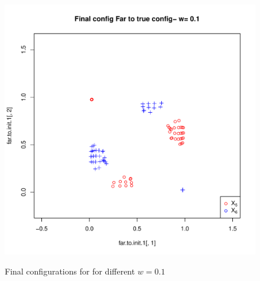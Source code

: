 \documentclass[12pt,oneside,final]{thesis}
\begin{document}
\begin{figure}
\begin{minipage}[b]{0.5\linewidth}
\label{fig:Finalconfig-MultMin-w-0_1_a}
\end{minipage}
\hspace{0.5cm}
\begin{minipage}[b]{0.5\linewidth}
\centering
\includegraphics[scale=0.45]{other-min-w-0_1.pdf}

\label{fig:Finalconfig-MultMin-w-0_1_b}
\end{minipage}

\caption{Final configurations for for different $w=0.1$ }
\label{fig:Finalconfig-MultMin-w-0_1}


\end{figure}
\end{document}
